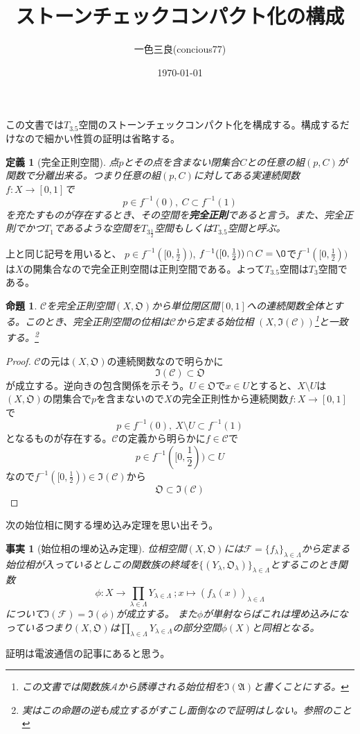 \documentclass[leqno]{jsarticle}
\title{ストーンチェックコンパクト化の構成}
\author{一色三良(concious77)}
\date{\today}
\newtheorem{prop}[thm]{命題}
\newtheorem{df}[thm]{定義}
\newtheorem{fact}[thm]{事実}
\begin{document}
\maketitle
この文書では$T_{3.5}$空間のストーンチェックコンパクト化を構成する。構成するだけなので細かい性質の証明は省略する。
\begin{df}[完全正則空間]
点$p$とその点を含まない閉集合$C$との任意の組$(p,C)$が関数で分離出来る。つまり任意の組$(p,C)$に対してある実連続関数$f:X\to [0,1]$で
\[
p\in f^{-1}(0),\ C\subset f^{-1}(1)
\]
を充たすものが存在するとき、その空間を{\bf 完全正則}であると言う。また、完全正則でかつ$T_1$であるような空間を$T_{3\frac{1}{2}}$空間もしくは$T_{3.5}$空間と呼ぶ。
\end{df}
上と同じ記号を用いると、	
$p\in f^{-1}([0,\frac{1}{2}))$, $f^{-1}([0,\frac{1}{2}))\cap C=\O$で$f^{-1}([0,\frac{1}{2}))$は$X$の開集合なので完全正則空間は正則空間である。よって$T_{3.5}$空間は$T_3$空間である。

\begin{prop}
$\mathcal{C}$を完全正則空間$(X,\mathfrak{O})$から単位閉区間$[0,1]$への連続関数全体とする。このとき、完全正則空間の位相は$\mathcal{C}$から定まる始位相
$(X,\mathfrak{I}(\mathcal{C}))$\footnote{この文書では関数族$\mathcal{A}$から誘導される始位相を$\mathfrak{I}(\mathfrak{A})$と書くことにする。}と一致する。\footnote{実はこの命題の逆も成立するがすこし面倒なので証明はしない。\cite{2}参照のこと}

\end{prop}
\begin{proof}
$\mathcal{C}$の元は$(X,\mathfrak{O})$の連続関数なので明らかに
\[
\mathfrak{I}(\mathcal{C})\subset \mathfrak{O}
\]
が成立する。逆向きの包含関係を示そう。$U\in \mathfrak{O}$で$x\in U$とすると、$X\setminus U$は$(X,\mathfrak{O})$の閉集合で$p$を含まないので$X$の完全正則性から連続関数$f:X\to [0,1]$で
\[
p\in f^{-1}(0),\ X\setminus U\subset f^{-1}(1)
\]
となるものが存在する。$\mathcal{C}$の定義から明らかに$f\in \mathcal{C}$で
\[
p\in f^{-1}([0,\frac{1}{2}))\subset U
\]
なので$f^{-1}([0,\frac{1}{2}))\in \mathfrak{I}(\mathcal{C})$から
\[
\mathfrak{O}\subset \mathfrak{I}(\mathcal{C})
\]
\end{proof}


次の始位相に関する埋め込み定理を思い出そう。
\begin{fact}[始位相の埋め込み定理]\label{main}位相空間$(X,\mathfrak{O})$には$\mathcal{F}=\{f_{\lambda}\}_{\lambda \in \Lambda}$から定まる始位相が入っているとしこの関数族の終域を$\{(Y_{\lambda},\mathfrak{O}_{\lambda})\}_{\lambda \in \Lambda}$とするこのとき関数
\[
\phi:X\rightarrow \prod_{\lambda\in \Lambda}Y_{\lambda \in \Lambda}\ ;x\mapsto(f_{\lambda}(x))_{\lambda\in \Lambda}
\]について$\mathfrak{I}(\mathcal{F})=\mathfrak{I}(\phi)$が成立する。
また$\phi$が単射ならばこれは埋め込みになっているつまり$(X,\mathfrak{O})$は$\prod_{\lambda\in \Lambda}Y_{\lambda \in \Lambda}$の部分空間$\phi(X)$と同相となる。
\end{fact}
証明は電波通信の記事にあると思う。
\end{document}
